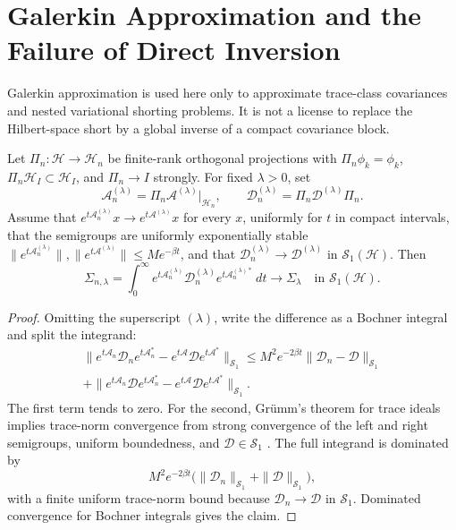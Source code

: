 \section{Galerkin Approximation and the Failure of Direct Inversion}
\label{app:galerkin_shorting}

Galerkin approximation is used here only to approximate trace-class covariances
and nested variational shorting problems.  It is not a license to replace the
Hilbert-space short by a global inverse of a compact covariance block.

\begin{lemma}
\label{lem:galerkin_trace_norm}
Let $\Pi_n:\mathcal{H}\to\mathcal{H}_n$ be finite-rank orthogonal projections
with $\Pi_n\phi_k=\phi_k$, $\Pi_n\mathcal{H}_I\subset\mathcal{H}_I$, and
$\Pi_n\to I$ strongly.  For fixed $\lambda>0$, set
\[
  \mathcal{A}_n^{(\lambda)}
  =\Pi_n\mathcal{A}^{(\lambda)}|_{\mathcal{H}_n},
  \qquad
  \mathcal{D}_n^{(\lambda)}
  =\Pi_n\mathcal{D}^{(\lambda)}\Pi_n .
\]
Assume that $e^{t\mathcal{A}_n^{(\lambda)}}x\to
e^{t\mathcal{A}^{(\lambda)}}x$ for every $x$, uniformly for $t$ in compact
intervals, that the semigroups are uniformly exponentially stable
$\|e^{t\mathcal{A}_n^{(\lambda)}}\|,
\|e^{t\mathcal{A}^{(\lambda)}}\|\le Me^{-\beta t}$, and that
$\mathcal{D}_n^{(\lambda)}\to\mathcal{D}^{(\lambda)}$ in
$\mathcal{S}_1(\mathcal{H})$.  Then
\[
  \Sigma_{n,\lambda}
  =
  \int_0^\infty
  e^{t\mathcal{A}_n^{(\lambda)}}
  \mathcal{D}_n^{(\lambda)}
  e^{t\mathcal{A}_n^{(\lambda)*}}\,dt
  \longrightarrow
  \Sigma_\lambda
  \quad\text{in }\mathcal{S}_1(\mathcal{H}).
\]
\end{lemma}

\begin{proof}
Omitting the superscript $(\lambda)$, write the difference as a Bochner
integral and split the integrand:
\begin{multline*}
  \|e^{t\mathcal{A}_n}\mathcal{D}_ne^{t\mathcal{A}_n^*}
    -e^{t\mathcal{A}}\mathcal{D}e^{t\mathcal{A}^*}\|_{\mathcal{S}_1}
  \le
  M^2e^{-2\beta t}\|\mathcal{D}_n-\mathcal{D}\|_{\mathcal{S}_1}\\
  +
  \|e^{t\mathcal{A}_n}\mathcal{D}e^{t\mathcal{A}_n^*}
    -e^{t\mathcal{A}}\mathcal{D}e^{t\mathcal{A}^*}\|_{\mathcal{S}_1}.
\end{multline*}
The first term tends to zero.  For the second, Gr\"umm's theorem for trace
ideals implies trace-norm convergence from strong convergence of the left and
right semigroups, uniform boundedness, and $\mathcal{D}\in\mathcal{S}_1$
\cite{simon2005trace}.  The full integrand is dominated by
\[
  M^2e^{-2\beta t}
  \bigl(\|\mathcal{D}_n\|_{\mathcal{S}_1}
        +\|\mathcal{D}\|_{\mathcal{S}_1}\bigr),
\]
with a finite uniform trace-norm bound because
$\mathcal{D}_n\to\mathcal{D}$ in $\mathcal{S}_1$.  Dominated convergence for
Bochner integrals gives the claim.
\end{proof}

